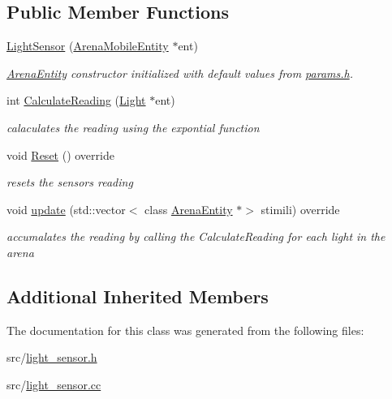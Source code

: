 \subsection*{Public Member Functions}
\begin{DoxyCompactItemize}
\item 
\mbox{\label{class_light_sensor_ac99ce134fee5ee22775a8d5a6531d02b}} 
\mbox{\hyperlink{class_light_sensor_ac99ce134fee5ee22775a8d5a6531d02b}{Light\+Sensor}} (\mbox{\hyperlink{class_arena_mobile_entity}{Arena\+Mobile\+Entity}} $\ast$ent)
\begin{DoxyCompactList}\small\item\em \mbox{\hyperlink{class_arena_entity}{Arena\+Entity}} constructor initialized with default values from \mbox{\hyperlink{params_8h}{params.\+h}}. \end{DoxyCompactList}\item 
\mbox{\label{class_light_sensor_abcd9b14b4c09ed48d09eddd72943f898}} 
int \mbox{\hyperlink{class_light_sensor_abcd9b14b4c09ed48d09eddd72943f898}{Calculate\+Reading}} (\mbox{\hyperlink{class_light}{Light}} $\ast$ent)
\begin{DoxyCompactList}\small\item\em calaculates the reading using the expontial function \end{DoxyCompactList}\item 
\mbox{\label{class_light_sensor_a8b8643f10dc619dd8f31ab87034a04f6}} 
void \mbox{\hyperlink{class_light_sensor_a8b8643f10dc619dd8f31ab87034a04f6}{Reset}} () override
\begin{DoxyCompactList}\small\item\em resets the sensors reading \end{DoxyCompactList}\item 
\mbox{\label{class_light_sensor_ac353ce16128a5bd434fa41cf99b70e3d}} 
void \mbox{\hyperlink{class_light_sensor_ac353ce16128a5bd434fa41cf99b70e3d}{update}} (std\+::vector$<$ class \mbox{\hyperlink{class_arena_entity}{Arena\+Entity}} $\ast$$>$ stimili) override
\begin{DoxyCompactList}\small\item\em accumalates the reading by calling the Calculate\+Reading for each light in the arena \end{DoxyCompactList}\end{DoxyCompactItemize}
\subsection*{Additional Inherited Members}


The documentation for this class was generated from the following files\+:\begin{DoxyCompactItemize}
\item 
src/\mbox{\hyperlink{light__sensor_8h}{light\+\_\+sensor.\+h}}\item 
src/\mbox{\hyperlink{light__sensor_8cc}{light\+\_\+sensor.\+cc}}\end{DoxyCompactItemize}
